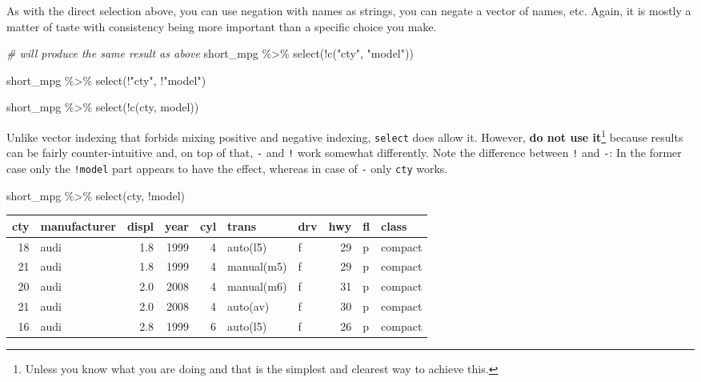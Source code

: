 \documentclass[
]{book}
\newenvironment{Shaded}{\begin{snugshade}}{\end{snugshade}}
\newcommand{\CommentTok}[1]{\textcolor[rgb]{0.56,0.35,0.01}{\textit{#1}}}
\newcommand{\FunctionTok}[1]{\textcolor[rgb]{0.00,0.00,0.00}{#1}}
\newcommand{\NormalTok}[1]{#1}
\newcommand{\SpecialCharTok}[1]{\textcolor[rgb]{0.00,0.00,0.00}{#1}}
\newcommand{\StringTok}[1]{\textcolor[rgb]{0.31,0.60,0.02}{#1}}
\begin{document}
As with the direct selection above, you can use negation with names as strings, you can negate a vector of names, etc. Again, it is mostly a matter of taste with consistency being more important than a specific choice you make.

\begin{Shaded}
\begin{Highlighting}[]
\CommentTok{\# will produce the same result as above}
\NormalTok{short\_mpg }\SpecialCharTok{\%\textgreater{}\%}
  \FunctionTok{select}\NormalTok{(}\SpecialCharTok{!}\FunctionTok{c}\NormalTok{(}\StringTok{"cty"}\NormalTok{, }\StringTok{"model"}\NormalTok{))}

\NormalTok{short\_mpg }\SpecialCharTok{\%\textgreater{}\%}
  \FunctionTok{select}\NormalTok{(}\SpecialCharTok{!}\StringTok{"cty"}\NormalTok{, }\SpecialCharTok{!}\StringTok{"model"}\NormalTok{)}
  
\NormalTok{short\_mpg }\SpecialCharTok{\%\textgreater{}\%}
  \FunctionTok{select}\NormalTok{(}\SpecialCharTok{!}\FunctionTok{c}\NormalTok{(cty, model))}
\end{Highlighting}
\end{Shaded}

Unlike vector indexing that forbids mixing positive and negative indexing, \texttt{select} does allow it. However, \textbf{do not use it}\footnote{Unless you know what you are doing and that is the simplest and clearest way to achieve this.} because results can be fairly counter-intuitive and, on top of that, \texttt{-} and \texttt{!} work somewhat differently. Note the difference between \texttt{!} and \texttt{-}: In the former case only the \texttt{!model} part appears to have the effect, whereas in case of \texttt{-} only \texttt{cty} works.

\begin{Shaded}
\begin{Highlighting}[]
\NormalTok{short\_mpg }\SpecialCharTok{\%\textgreater{}\%}
  \FunctionTok{select}\NormalTok{(cty, }\SpecialCharTok{!}\NormalTok{model)}
\end{Highlighting}
\end{Shaded}

\begin{tabular}{r|l|r|r|r|l|l|r|l|l}
\hline
cty & manufacturer & displ & year & cyl & trans & drv & hwy & fl & class\\
\hline
18 & audi & 1.8 & 1999 & 4 & auto(l5) & f & 29 & p & compact\\
\hline
21 & audi & 1.8 & 1999 & 4 & manual(m5) & f & 29 & p & compact\\
\hline
20 & audi & 2.0 & 2008 & 4 & manual(m6) & f & 31 & p & compact\\
\hline
21 & audi & 2.0 & 2008 & 4 & auto(av) & f & 30 & p & compact\\
\hline
16 & audi & 2.8 & 1999 & 6 & auto(l5) & f & 26 & p & compact\\
\hline
\end{tabular}
\end{document}

